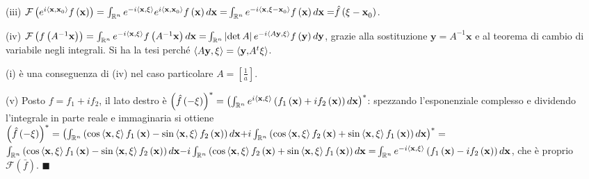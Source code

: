 \documentclass{article}
\begin{document}
(iii) $\mathcal{F}\left( e^{i\left\langle \mathbf{x,x}_{0}\right\rangle
}f\left( \mathbf{x}\right) \right) =\int_{%
\mathbb{R}
^{n}}e^{-i\left\langle \mathbf{x,\xi }\right\rangle }e^{i\left\langle 
\mathbf{x,x}_{0}\right\rangle }f\left( \mathbf{x}\right) d\mathbf{x=}\int_{%
\mathbb{R}
^{n}}e^{-i\left\langle \mathbf{x,\xi -x}_{0}\right\rangle }f\left( \mathbf{x}%
\right) d\mathbf{x=}\hat{f}\left( \mathbf{\xi -x}_{0}\right) $.

(iv) $\mathcal{F}\left( f\left( A^{-1}\mathbf{x}\right) \right) =\int_{%
\mathbb{R}
^{n}}e^{-i\left\langle \mathbf{x,\xi }\right\rangle }f\left( A^{-1}\mathbf{x}%
\right) d\mathbf{x=}\int_{%
\mathbb{R}
^{n}}\left\vert \det A\right\vert e^{-i\left\langle A\mathbf{y,\xi }%
\right\rangle }f\left( \mathbf{y}\right) d\mathbf{y}$, grazie alla
sostituzione $\mathbf{y}=A^{-1}\mathbf{x}$ e al teorema di cambio di
variabile negli integrali. Si ha la tesi perch\'{e} $\left\langle A\mathbf{%
y,\xi }\right\rangle =\left\langle \mathbf{y,}A^{t}\mathbf{\xi }%
\right\rangle $.

(i) \`{e} una conseguenza di (iv) nel caso particolare $A=\left[ \frac{1}{a}%
\right] $.

(v) Posto $f=f_{1}+if_{2}$, il lato destro \`{e} $\left( \hat{f}\left( -%
\mathbf{\xi }\right) \right) ^{\ast }=\left( \int_{%
\mathbb{R}
^{n}}e^{i\left\langle \mathbf{x,\xi }\right\rangle }\left( f_{1}\left( 
\mathbf{x}\right) +if_{2}\left( \mathbf{x}\right) \right) d\mathbf{x}\right)
^{\ast }$: spezzando l'esponenziale complesso e dividendo l'integrale in
parte reale e immaginaria si ottiene $\left( \hat{f}\left( -\mathbf{\xi }%
\right) \right) ^{\ast }=\left( \int_{%
\mathbb{R}
^{n}}\left( \cos \left\langle \mathbf{x,\xi }\right\rangle f_{1}\left( 
\mathbf{x}\right) -\sin \left\langle \mathbf{x,\xi }\right\rangle
f_{2}\left( \mathbf{x}\right) \right) d\mathbf{x+}i\int_{%
\mathbb{R}
^{n}}\left( \cos \left\langle \mathbf{x,\xi }\right\rangle f_{2}\left( 
\mathbf{x}\right) +\sin \left\langle \mathbf{x,\xi }\right\rangle
f_{1}\left( \mathbf{x}\right) \right) d\mathbf{x}\right) ^{\ast }=$ $\int_{%
\mathbb{R}
^{n}}\left( \cos \left\langle \mathbf{x,\xi }\right\rangle f_{1}\left( 
\mathbf{x}\right) -\sin \left\langle \mathbf{x,\xi }\right\rangle
f_{2}\left( \mathbf{x}\right) \right) d\mathbf{x-}i\int_{%
\mathbb{R}
^{n}}\left( \cos \left\langle \mathbf{x,\xi }\right\rangle f_{2}\left( 
\mathbf{x}\right) +\sin \left\langle \mathbf{x,\xi }\right\rangle
f_{1}\left( \mathbf{x}\right) \right) d\mathbf{x=}\int_{%
\mathbb{R}
^{n}}e^{-i\left\langle \mathbf{x,\xi }\right\rangle }\left( f_{1}\left( 
\mathbf{x}\right) -if_{2}\left( \mathbf{x}\right) \right) d\mathbf{x}$, che 
\`{e} proprio $\mathcal{F}\left( \bar{f}\right) $. $\blacksquare $
\end{document}
